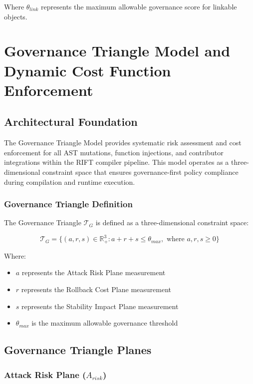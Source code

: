 Where $\theta_{link}$ represents the maximum allowable governance score for linkable objects.

\section{Governance Triangle Model and Dynamic Cost Function Enforcement}
\label{sec:governance-triangle}

\subsection{Architectural Foundation}

The Governance Triangle Model provides systematic risk assessment and cost enforcement for all AST mutations, function injections, and contributor integrations within the RIFT compiler pipeline. This model operates as a three-dimensional constraint space that ensures governance-first policy compliance during compilation and runtime execution.

\subsubsection{Governance Triangle Definition}

The Governance Triangle $\mathcal{T}_G$ is defined as a three-dimensional constraint space:

\begin{equation}
\mathcal{T}_G = \{(a, r, s) \in \mathbb{R}^3_+ : a + r + s \leq \theta_{max}, \text{ where } a, r, s \geq 0\}
\end{equation}

Where:
\begin{itemize}
    \item $a$ represents the Attack Risk Plane measurement
    \item $r$ represents the Rollback Cost Plane measurement  
    \item $s$ represents the Stability Impact Plane measurement
    \item $\theta_{max}$ is the maximum allowable governance threshold
\end{itemize}

\subsection{Governance Triangle Planes}

\subsubsection{Attack Risk Plane ($A_{risk}$)}

